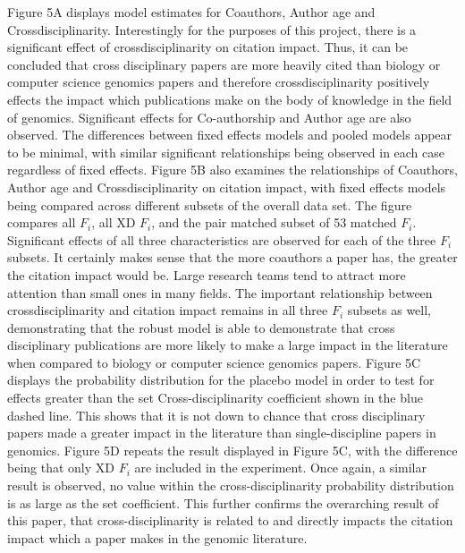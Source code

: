 \documentclass[10pt]{article}          %
\begin{document}
Figure 5A displays model estimates for Coauthors, Author age and Crossdisciplinarity. Interestingly for the purposes of this project, there is a significant effect of crossdisciplinarity on citation impact. Thus, it can be concluded that cross disciplinary papers are more heavily cited than biology or computer science genomics papers and therefore crossdisciplinarity positively effects the impact which publications make on the body of knowledge in the field of genomics. Significant effects for Co-authorship and Author age are also observed. The differences between fixed effects models and pooled models appear to be minimal, with similar significant relationships being observed in each case regardless of fixed effects. Figure 5B also examines the relationships of Coauthors, Author age and Crossdisciplinarity on citation impact, with fixed effects models being compared across different subsets of the overall data set. The figure compares all $F_i$, all XD $F_i$, and the pair matched subset of 53 matched $F_i$. Significant effects of all three characteristics are observed for each of the three $F_i$ subsets. It certainly makes sense that the more coauthors a paper has, the greater the citation impact would be. Large research teams tend to attract more attention than small ones in many fields. The important relationship between crossdisciplinarity and citation impact remains in all three $F_i$ subsets as well, demonstrating that the robust model is able to demonstrate that cross disciplinary publications are more likely to make a large impact in the literature when compared to biology or computer science genomics papers. Figure 5C displays the probability distribution for the placebo model in order to test for effects greater than the set Cross-disciplinarity coefficient shown in the blue dashed line. This shows that it is not down to chance that cross disciplinary papers made a greater impact in the literature than single-discipline papers in genomics. Figure 5D repeats the result displayed in Figure 5C, with the difference being that only XD $F_i$ are included in the experiment. Once again, a similar result is observed, no value within the cross-disciplinarity probability distribution is as large as the set coefficient. This further confirms the overarching result of this paper, that cross-disciplinarity is related to and directly impacts the citation impact which a paper makes in the genomic literature. 

\newpage
\end{document}
